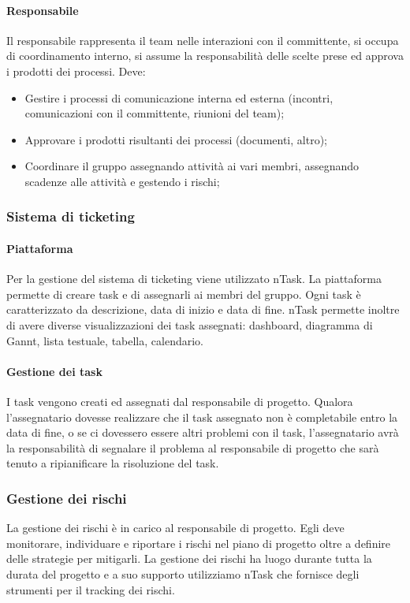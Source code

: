 \paragraph{Responsabile} \Spazio
Il responsabile rappresenta il team nelle interazioni con il committente, si occupa di coordinamento interno, si assume la responsabilità delle scelte prese ed approva i prodotti dei processi. Deve:
\begin{itemize} 
\item Gestire i processi di comunicazione interna ed esterna (incontri, comunicazioni con il committente, riunioni del team);
\item Approvare i prodotti risultanti dei processi (documenti, altro);
\item Coordinare il gruppo assegnando attività ai vari membri, assegnando scadenze alle attività e gestendo i rischi;
\end{itemize}

\subsubsection{Sistema di ticketing}
\paragraph{Piattaforma}
Per la gestione del sistema di ticketing viene utilizzato nTask. La piattaforma permette
di creare task e di assegnarli ai membri del gruppo. Ogni task è caratterizzato da
descrizione, data di inizio e data di fine. nTask permette inoltre di avere diverse visualizzazioni dei task assegnati: dashboard, diagramma di Gannt, lista testuale, tabella, calendario.

\paragraph{Gestione dei task}
I task vengono creati ed assegnati dal responsabile di progetto. Qualora l'assegnatario dovesse realizzare che il task assegnato non è completabile entro la data di fine, o se ci dovessero essere altri problemi con il task, l'assegnatario avrà la responsabilità di segnalare il problema al responsabile di progetto che sarà tenuto a ripianificare la risoluzione del task.

\subsubsection{Gestione dei rischi}
La gestione dei rischi è in carico al responsabile di progetto. Egli deve monitorare, 
individuare e riportare i rischi nel piano di progetto oltre a definire delle strategie per mitigarli. La gestione dei rischi ha luogo durante tutta la durata del progetto e a suo supporto utilizziamo nTask che fornisce degli strumenti per il tracking dei rischi.

